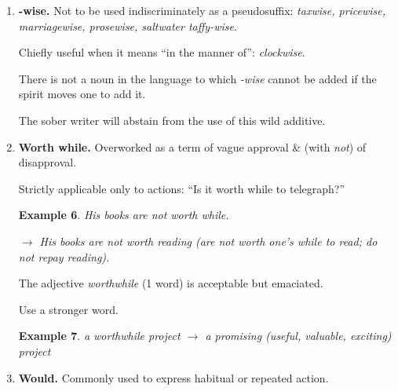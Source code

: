 \documentclass{article}
\newtheorem{example}{Example}
\begin{document}
\begin{enumerate}
\begin{example}
		$\to$ The office \& salesrooms are on the ground floor; the rest of the building is used for manufacturing.
	\end{example}
	Its use as a virtual equivalent {\it of although} is allowable in sentences where this leads to no ambiguity or absurdity.
	\begin{example}
		While I admire his energy, I wish it were employed in a better cause.
	\end{example}
	This is entirely correct, as shown by the paraphrase
	\begin{example}
		I admire his energy; at the same time, I wish it were employed in a better cause.
	\end{example}
	Compare:
	\begin{example}
		While the temperature reaches 90 or 95 degrees in the daytime, the nights are often chilly.
	\end{example}
	The paraphrase shows why the use of {\it while} is incorrect:
	\begin{example}
		The temperature reaches 90 or 95 degrees in the daytime; at the same time the nights are often chilly.
	\end{example}
	In general, the writer will do well to use {\it while} only with strict literalness, in the sense of ``during the time that.''
	\item {\bf -wise.} Not to be used indiscriminately as a pseudosuffix: {\it taxwise, pricewise, marriagewise, prosewise, saltwater taffy-wise}.
	
	Chiefly useful when it means ``in the manner of'': {\it clockwise}.
	
	There is not a noun in the language to which {\it -wise} cannot be added if the spirit moves one to add it.
	
	The sober writer will abstain from the use of this wild additive.
	\item {\bf Worth while.} Overworked as a term of vague approval \& (with {\it not}) of disapproval.
	
	Strictly applicable only to actions: ``Is it worth while to telegraph?''
	\begin{example}
		His books are not worth while.
		
		$\to$ His books are not worth reading (are not worth one's while to read; do not repay reading).
	\end{example}
	The adjective {\it worthwhile} (1 word) is acceptable but emaciated.
	
	Use a stronger word.
	\begin{example}
		a worthwhile project $\to$ a promising (useful, valuable, exciting) project
	\end{example}
	\item {\bf Would.} Commonly used to express habitual or repeated action.
	

\end{enumerate}
\end{document}
